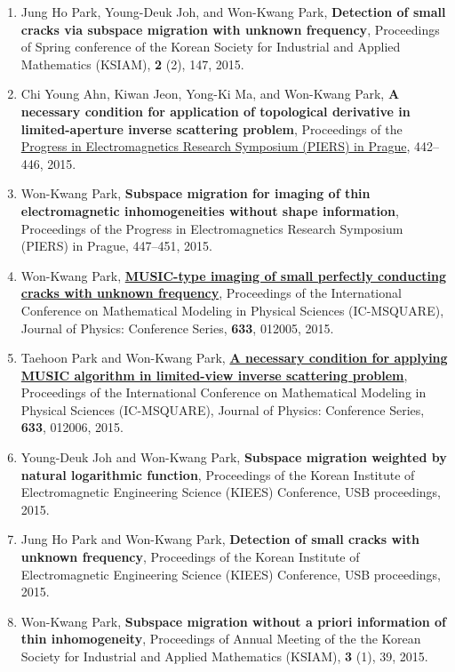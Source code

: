 \documentclass[10pt,A4]{article}
\begin{document}
\begin{enumerate}
\item\label{C-KSIAM2015B} Jung Ho Park, Young-Deuk Joh, and Won-Kwang Park, \textbf{Detection of small cracks via subspace migration with unknown frequency}, Proceedings of Spring conference of the Korean Society for Industrial and Applied Mathematics (KSIAM), \textbf{2} (2), 147, 2015.
\item\label{C-PIERS2015A} Chi Young Ahn, Kiwan Jeon, Yong-Ki Ma, and Won-Kwang Park, \textbf{A necessary condition for application of topological derivative in limited-aperture inverse scattering problem}, Proceedings of the \href{http://www.piers.org/piers2015Prague/}{Progress in Electromagnetics Research Symposium (PIERS) in Prague}, 442--446, 2015.
\item\label{C-PIERS2015B} Won-Kwang Park, \textbf{Subspace migration for imaging of thin electromagnetic inhomogeneities without shape information}, Proceedings of the Progress in Electromagnetics Research Symposium (PIERS) in Prague, 447--451, 2015.
\item\label{C-ICMSQUARE2015A} Won-Kwang Park, \href{http://dx.doi.org/10.1088/1742-6596/633/1/012005}{\textbf{MUSIC-type imaging of small perfectly conducting cracks with unknown frequency}}, Proceedings of the International Conference on Mathematical Modeling in Physical Sciences (IC-MSQUARE), Journal of Physics: Conference Series, \textbf{633}, 012005, 2015.
\item\label{C-ICMSQUARE2015B} Taehoon Park and Won-Kwang Park, \href{http://dx.doi.org/10.1088/1742-6596/633/1/012006}{\textbf{A necessary condition for applying MUSIC algorithm in limited-view inverse scattering problem}}, Proceedings of the International Conference on Mathematical Modeling in Physical Sciences (IC-MSQUARE), Journal of Physics: Conference Series, \textbf{633}, 012006, 2015.
\item\label{C-KIEES2015A} Young-Deuk Joh and Won-Kwang Park, \textbf{Subspace migration weighted by natural logarithmic function}, Proceedings of the Korean Institute of Electromagnetic Engineering Science (KIEES) Conference, USB proceedings, 2015.
\item\label{C-KIEES2015B} Jung Ho Park and Won-Kwang Park, \textbf{Detection of small cracks with unknown frequency}, Proceedings of the Korean Institute of Electromagnetic Engineering Science (KIEES) Conference, USB proceedings, 2015.
\item\label{C-KSIAM2015C} Won-Kwang Park, \textbf{Subspace migration without a priori information of thin inhomogeneity}, Proceedings of Annual Meeting of the the Korean Society for Industrial and Applied Mathematics (KSIAM), \textbf{3} (1), 39, 2015.

\end{enumerate}
\end{document}
